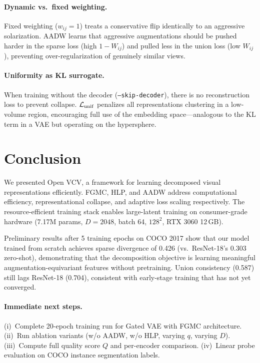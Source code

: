 \documentclass[10pt,twocolumn]{article}
\begin{document}
\paragraph{Dynamic vs.\ fixed weighting.}
Fixed weighting ($w_{ij}{=}1$) treats a conservative flip identically to an
aggressive solarization. AADW learns that aggressive augmentations should be
pushed harder in the sparse loss (high $1{-}W_{ij}$) and pulled less in the union
loss (low $W_{ij}$), preventing over-regularization of genuinely similar views.

\paragraph{Uniformity as KL surrogate.}
When training without the decoder (\texttt{--skip-decoder}), there is no
reconstruction loss to prevent collapse. $\mathcal{L}_{\rm unif}$ penalizes all
representations clustering in a low-volume region, encouraging full use of the
embedding space---analogous to the KL term in a VAE but operating on the
hypersphere.

\section{Conclusion}
\label{sec:conclusion}

We presented Open VCV, a framework for learning decomposed visual representations
efficiently. FGMC, HLP, and AADW address computational efficiency, representational
collapse, and adaptive loss scaling respectively. The resource-efficient training
stack enables large-latent training on consumer-grade hardware (7.17M params,
$D{=}2048$, batch 64, $128^2$, RTX 3060 12\,GB).

Preliminary results after 5 training epochs on COCO 2017 show that our model
trained from scratch achieves sparse divergence of 0.426 (vs.~ResNet-18's 0.303
zero-shot), demonstrating that the decomposition objective is learning meaningful
augmentation-equivariant features without pretraining. Union consistency (0.587)
still lags ResNet-18 (0.704), consistent with early-stage training that has not
yet converged.

\paragraph{Immediate next steps.}
(i)~Complete 20-epoch training run for Gated VAE with FGMC architecture.
(ii)~Run ablation variants (w/o AADW, w/o HLP, varying $q$, varying $D$).
(iii)~Compute full quality score $Q$ and per-encoder comparison.
(iv)~Linear probe evaluation on COCO instance segmentation labels.
\end{document}
